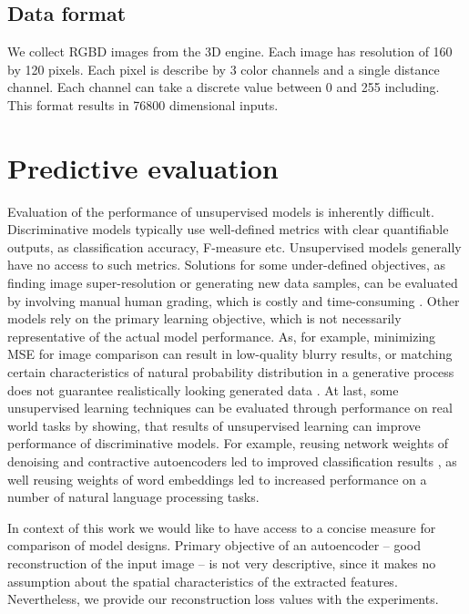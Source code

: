 \subsection{Data format}

We collect RGBD images from the 3D engine. Each image has resolution of 160 by 120 pixels. Each pixel is describe by 3 color channels and a single distance channel. Each channel can take a discrete value between 0 and 255 including. This format results in 76800 dimensional inputs.


\section{Predictive evaluation}

Evaluation of the performance of unsupervised models is inherently difficult.
Discriminative models typically use well-defined metrics with clear quantifiable outputs, as classification accuracy, F-measure etc. Unsupervised models generally have no access to such metrics.
Solutions for some under-defined objectives, as finding image super-resolution or generating new data samples, can be evaluated by involving manual human grading, which is costly and time-consuming \cite{Dahl2017, Goodfellow2014}.
Other models rely on the primary learning objective, which is not necessarily representative of the actual model performance. As, for example, minimizing MSE for image comparison can result in low-quality blurry results, or matching certain characteristics of natural probability distribution in a generative process does not guarantee realistically looking generated data \cite{Li2015, Mathieu2015}. At last, some unsupervised learning techniques can be evaluated through performance on real world tasks by showing, that results of unsupervised learning can improve performance of discriminative models. For example, reusing network weights of denoising and contractive autoencoders led to improved classification results \cite{Rifai2011, Vincent2010}, as well reusing weights of word embeddings \cite{NIPS2013_5021} led to increased performance on a number of natural language processing tasks.

In context of this work we would like to have access to a concise measure for comparison of model designs.
Primary objective of an autoencoder -- good reconstruction of the input image -- is not very descriptive, since it makes no assumption about the spatial characteristics of the extracted features. Nevertheless, we provide our reconstruction loss values with the experiments.


